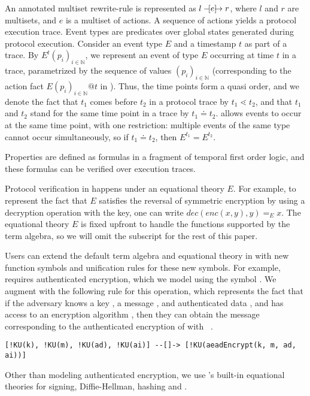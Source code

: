 An annotated multiset rewrite-rule is represented as
$l \ifarrow[e] r$, where $l$ and $r$ are multisets, and $e$ is
a multiset of actions.
%
A sequence of actions yields a protocol execution trace.
%
Event types are predicates over global states generated during protocol 
execution.
%
Consider an event type $E$ and a timestamp $t$ as part of a trace.
%
By $E^{t}(p_i)_{i\in\mathbb{N}}$, we represent an event of type $E$ occurring
at time $t$ in a trace, parametrized by the sequence of values
$(p_i)_{i\in\mathbb{N}}$
(corresponding to the action fact $E(p_i)_{i\in\mathbb{N}}@t$ in \mTamarin).
%
Thus, the time points form a quasi order, and we denote the fact that
$t_{1}$ comes before $t_{2}$ in a protocol trace by
$t_{1} \lessdot t_{2}$, and that $t_{1}$ and $t_{2}$ stand for the same
time point in a trace by $t_{1} \doteq t_{2}$.
%
\mTamarin{} allows events to occur at the same time point, with one
restriction: multiple events of the same type cannot occur simultaneously,
so if $t_{1} \doteq t_{2}$, then $E^{t_{1}} = E^{t_{2}}$.
%

Properties are defined as formulas in a fragment of temporal first order logic,
and these formulas can be verified over execution traces.
%

Protocol verification in \mTamarin{} happens under an equational theory $E$.
%
For example, to represent the fact that $E$ satisfies the reversal of
symmetric encryption by using a decryption operation with the key,
one can write $\textit{dec}(\textit{enc}(x, y), y) =_{E} x$.
%
The equational theory $E$ is fixed upfront to handle the functions supported 
by
the term algebra, so we will omit the subscript for the rest of this paper.
%

Users can extend the default term algebra and equational theory in
\mTamarin{} with new function symbols and unification rules for these new 
symbols.
%
For example, \mEdhoc{} requires authenticated encryption, which we model 
using
the symbol .
%
We augment \mTamarin{} with the following rule for this operation,
which represents the fact that if the adversary knows a key ,
a message , and authenticated data ,
and has access to an encryption algorithm ,
then they can obtain the message corresponding to the authenticated 
encryption
of  with ~\cite{Norr21}.
%
{\footnotesize
\begin{verbatim}
[!KU(k), !KU(m), !KU(ad), !KU(ai)] --[]-> [!KU(aeadEncrypt(k, m, ad, ai))]
\end{verbatim}}
%
Other than modeling authenticated encryption, we use \mTamarin{}'s built-in
equational theories for signing, Diffie-Hellman, hashing and \mXor{}.
%

